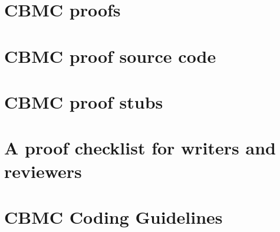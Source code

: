 \documentclass[twoside]{book}
\newcommand{\+}{\discretionary{\mbox{\scriptsize$\hookleftarrow$}}{}{}}
\begin{document}
\chapter{CBMC proofs}
\label{md_crt_aws_crt_cpp_crt_aws_c_common_verification_cbmc_templates_template_for_repository_proofs__r_e_a_d_m_e}

\chapter{CBMC proof source code}
\label{md_crt_aws_crt_cpp_crt_aws_c_common_verification_cbmc_templates_template_for_repository_sources__r_e_a_d_m_e}

\chapter{CBMC proof stubs}
\label{md_crt_aws_crt_cpp_crt_aws_c_common_verification_cbmc_templates_template_for_repository_stubs__r_e_a_d_m_e}

\chapter{A proof checklist for writers and reviewers}
\label{md_crt_aws_crt_cpp_crt_aws_c_common_verification_cbmc_templates_training_material_checklist}

\chapter{CBMC Coding Guidelines}
\label{md_crt_aws_crt_cpp_crt_aws_c_common_verification_cbmc_templates_training_material__c_o_d_i_n_g__f_o_r__v_e_r_i_f_i_c_a_t_i_o_n}

\end{document}
